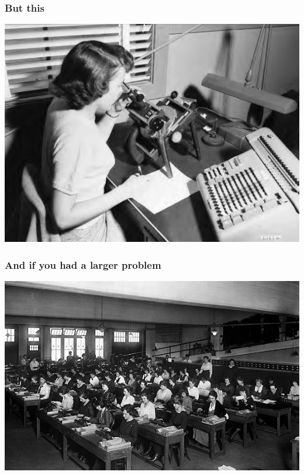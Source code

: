 \documentclass{beamer}
\begin{document}
\begin{frame}
  \frametitle{But this}

  \includegraphics[width=\textwidth]{img/human-computer.jpg}
\end{frame}

\begin{frame}
  \frametitle{And if you had a larger problem}

  \includegraphics[width=\textwidth]{img/human-computers.jpg}
\end{frame}
\end{document}
